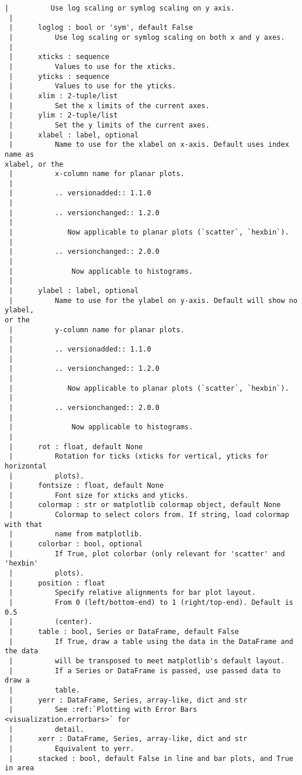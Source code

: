 \documentclass[11pt]{article}
\begin{document}
\begin{Verbatim}[commandchars=\\\{\}]
 |          Use log scaling or symlog scaling on y axis.
 |
 |      loglog : bool or 'sym', default False
 |          Use log scaling or symlog scaling on both x and y axes.
 |
 |      xticks : sequence
 |          Values to use for the xticks.
 |      yticks : sequence
 |          Values to use for the yticks.
 |      xlim : 2-tuple/list
 |          Set the x limits of the current axes.
 |      ylim : 2-tuple/list
 |          Set the y limits of the current axes.
 |      xlabel : label, optional
 |          Name to use for the xlabel on x-axis. Default uses index name as
xlabel, or the
 |          x-column name for planar plots.
 |
 |          .. versionadded:: 1.1.0
 |
 |          .. versionchanged:: 1.2.0
 |
 |             Now applicable to planar plots (`scatter`, `hexbin`).
 |
 |          .. versionchanged:: 2.0.0
 |
 |              Now applicable to histograms.
 |
 |      ylabel : label, optional
 |          Name to use for the ylabel on y-axis. Default will show no ylabel,
or the
 |          y-column name for planar plots.
 |
 |          .. versionadded:: 1.1.0
 |
 |          .. versionchanged:: 1.2.0
 |
 |             Now applicable to planar plots (`scatter`, `hexbin`).
 |
 |          .. versionchanged:: 2.0.0
 |
 |              Now applicable to histograms.
 |
 |      rot : float, default None
 |          Rotation for ticks (xticks for vertical, yticks for horizontal
 |          plots).
 |      fontsize : float, default None
 |          Font size for xticks and yticks.
 |      colormap : str or matplotlib colormap object, default None
 |          Colormap to select colors from. If string, load colormap with that
 |          name from matplotlib.
 |      colorbar : bool, optional
 |          If True, plot colorbar (only relevant for 'scatter' and 'hexbin'
 |          plots).
 |      position : float
 |          Specify relative alignments for bar plot layout.
 |          From 0 (left/bottom-end) to 1 (right/top-end). Default is 0.5
 |          (center).
 |      table : bool, Series or DataFrame, default False
 |          If True, draw a table using the data in the DataFrame and the data
 |          will be transposed to meet matplotlib's default layout.
 |          If a Series or DataFrame is passed, use passed data to draw a
 |          table.
 |      yerr : DataFrame, Series, array-like, dict and str
 |          See :ref:`Plotting with Error Bars <visualization.errorbars>` for
 |          detail.
 |      xerr : DataFrame, Series, array-like, dict and str
 |          Equivalent to yerr.
 |      stacked : bool, default False in line and bar plots, and True in area

\end{Verbatim}
\end{document}
